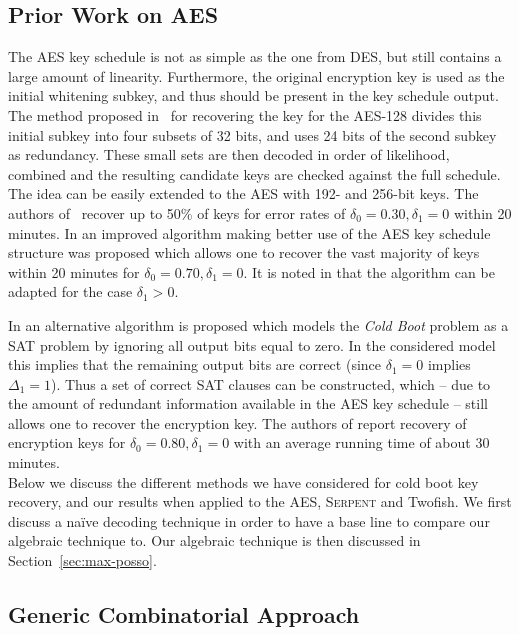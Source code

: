 \documentclass{llncs}
\newcommand{\Serpent}{\textsc{Serpent}\xspace}
\newcommand{\coldboot}{\emph{Cold Boot}\xspace}
\begin{document}
\subsection{Prior Work on AES}

The AES key schedule is not as simple as the one from DES, but still contains a large amount of linearity. Furthermore, the original encryption key is used as the initial whitening subkey, and thus should be present in the key schedule output. 
The method proposed in~\cite{coldboot} for recovering the key for the AES-128 divides this initial subkey into four subsets of 32 bits, and uses 24 bits of the second subkey as redundancy. These small sets are then decoded in order of likelihood, combined and the resulting candidate keys are checked against the full schedule. The idea can be easily extended to the AES with 192- and 256-bit keys. 
The authors of~\cite{coldboot} recover up to 50\% of keys for error rates of $\delta_0 = 0.30,\delta_1=0$ within 20 minutes. In \cite{tsow} an improved algorithm making better use of the AES key schedule structure was proposed which allows one to recover the vast majority of keys within 20 minutes for $\delta_0 = 0.70, \delta_1=0$. It is noted in \cite{tsow} that the algorithm can be adapted for the case $\delta_1 > 0$.

In \cite{aes-sat} an alternative algorithm is proposed which models the \coldboot problem as a SAT problem by ignoring all output bits equal to zero. In the considered model this implies that the remaining output bits are correct (since $\delta_1=0$ implies $\Delta_1 = 1$). Thus a set of correct SAT clauses can be constructed, which -- due to the amount of redundant information available in the AES key schedule -- still allows one to recover the encryption key. The authors of \cite{aes-sat} report recovery of encryption keys for $\delta_0=0.80,\delta_1=0$ with an average running time of about 30 minutes.
\\

Below we discuss the different methods we have considered for cold boot key recovery, and our results when applied to the AES, \Serpent and Twofish. We first discuss a na\"ive decoding technique in order to have a base line to compare our algebraic technique to. Our algebraic technique is then discussed in Section~\ref{sec:max-posso}.


\subsection{Generic Combinatorial Approach}
\label{sec:combinat}
\end{document}
